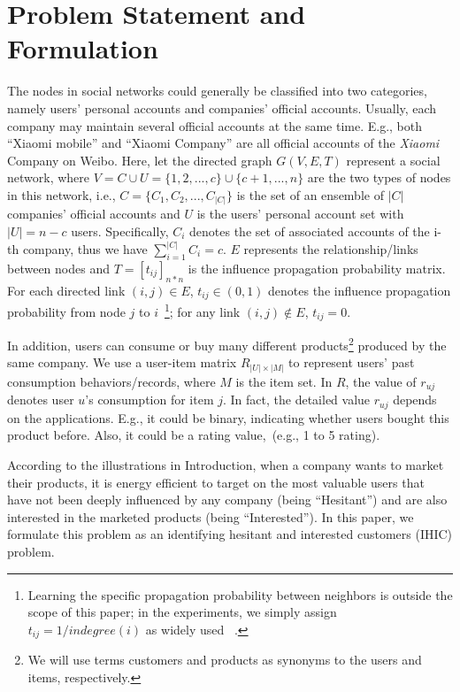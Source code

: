 \documentclass{llncs}
\begin{document}
\vspace*{-0.4cm}
\section{Problem Statement and Formulation}
\vspace*{-0.4cm}

The nodes in social networks could generally be classified into two categories, namely users' personal accounts and companies' official accounts. Usually, each company may maintain several official accounts at the same time. E.g., both ``Xiaomi mobile'' and ``Xiaomi Company'' are all official accounts of the \emph{Xiaomi} Company on Weibo. Here, let the directed graph $G(V,E,T)$ represent a social network, where $V= C\cup U=\{1,2,...,c\}\cup \{c+1,...,n\}$ are the two types of nodes in this network, i.e.,  $C=\{C_1,C_2,...,C_{|C|}\}$ is the set of an ensemble of $|C|$ companies' official accounts and $U$ is the users' personal account set with $|U|=n-c$ users. Specifically, $C_i$ denotes the set of associated accounts of the i-th company, thus we have $\sum_{i=1}^{|C|} C_i=c$. $E$ represents the relationship/links between nodes and $T=[t_{ij}]_{n*n}$ is the influence propagation probability matrix.
For each directed link $(i,j) \in E$, $t_{ij} \in (0,1)$ denotes the influence propagation probability from node $j$ to $i$~\footnote{Learning the specific propagation probability between neighbors is outside the scope of this paper; in the experiments, we simply assign $t_{ij} = 1/indegree(i)$ as widely used ~\cite{kempe2003maximizing,ijcai13biaoxiang}.}; for any link $(i,j) \notin E$, $t_{ij}=0$.

In addition, users can consume or buy many different products\footnote{We will use terms customers and products as synonyms to the users and items, respectively.} produced by the same company. We use a user-item matrix $R_{|U|\times |M|}$ to represent users' past consumption behaviors/records, where $M$ is the item set. In $R$, the value of $r_{uj}$ denotes user $u$'s  consumption for item $j$. In fact, the detailed value $r_{uj}$ depends on the applications. E.g., it could be binary, indicating whether users bought this product before. Also, it could be a rating value,~(e.g., 1 to 5 rating). 


According to the illustrations in Introduction, when a company wants to market their products, it is energy efficient to target on the most valuable users that have not been deeply influenced by any company (being ``Hesitant'') and are also interested in the marketed products (being ``Interested''). In this paper, we formulate this problem as an identifying hesitant and interested customers (IHIC) problem.
\end{document}
